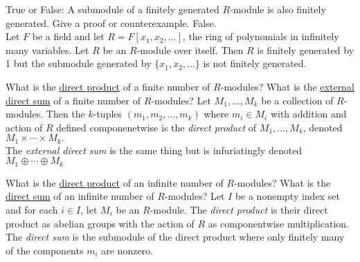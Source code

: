 \documentclass[avery5371,grid]{flashcards}
\newcommand{\Z}{\mathbb{Z}}
\begin{document}
\begin{flashcard}[Modules]{True or False: A submodule of a finitely generated $R$-module is also finitely generated. Give a proof or counterexample.}
 False.\\
 
 Let $F$ be a field and let $R = F[x_1, x_2, \ldots]$, the ring of polynomials in infinitely many variables. Let $R$ be an $R$-module over itself. Then $R$ is finitely generated by 1 but the submodule generated by $\{x_1, x_2, \ldots \}$ is not finitely generated.
\end{flashcard}


\begin{flashcard}[Modules]{What is the \underline{direct product} of a finite number of $R$-modules? What is the \underline{external direct sum} of a finite number of $R$-modules?}
 Let $M_1, \ldots, M_k$ be a collection of $R$-modules. Then the $k$-tuples $(m_1, m_2, \ldots, m_k)$ where $m_i \in M_i$ with addition and action of $R$ defined componenetwise is the \emph{direct product} of $M_1, \ldots, M_k$, denoted $M_1 \times \cdots \times M_k.$\\
 
 The \emph{external direct sum} is the same thing but is infuriatingly denoted $M_1 \oplus \cdots \oplus M_k$
\end{flashcard}


\begin{flashcard}[Modules]{What is the \underline{direct product} of an infinite number of $R$-modules? What is the \underline{direct sum} of an infinite number of $R$-modules?}
 Let $I$ be a nonempty index set and for each $i \in I$, let $M_i$ be an $R$-module. The \emph{direct product} is their direct product as abelian groups with the action of $R$ as componentwise multiplication.\\
 
 The \emph{direct sum} is the submodule of the direct product where only finitely many of the components $m_i$ are nonzero.
\end{flashcard}


\end{document}
